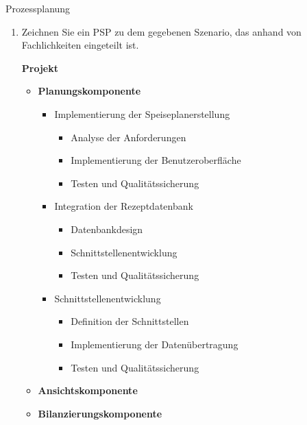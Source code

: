 \documentclass{article}
\begin{document}
\begin{exercise}{Prozessplanung}
  \begin{enumerate}
    \item Zeichnen Sie ein PSP zu dem gegebenen Szenario, das anhand von Fachlichkeiten eingeteilt ist.

          \begin{solution}
            \textbf{Projekt}

            \begin{itemize}
              \item \textbf{Planungskomponente}
                    \begin{itemize}
                      \item Implementierung der Speiseplanerstellung
                            \begin{itemize}
                              \item Analyse der Anforderungen
                              \item Implementierung der Benutzeroberfläche
                              \item Testen und Qualitätssicherung
                            \end{itemize}
                      \item Integration der Rezeptdatenbank
                            \begin{itemize}
                              \item Datenbankdesign
                              \item Schnittstellenentwicklung
                              \item Testen und Qualitätssicherung
                            \end{itemize}
                      \item Schnittstellenentwicklung
                            \begin{itemize}
                              \item Definition der Schnittstellen
                              \item Implementierung der Datenübertragung
                              \item Testen und Qualitätssicherung
                            \end{itemize}
                    \end{itemize}
              \item \textbf{Ansichtskomponente}
              \item \textbf{Bilanzierungskomponente}
            \end{itemize}
          \end{solution}


\end{enumerate}
\end{exercise}
\end{document}
